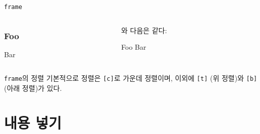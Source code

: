 \documentclass[compress]{beamer}
\begin{document}
\begin{frame}[fragile=singleslide]{\texttt{frame}}
  \begin{columns}
    \begin{column}{0.5\textwidth}
      \begin{latexcode}
        \begin{frame}[c]
          \frametitle{Foo}
          Bar
        \end{frame}
      \end{latexcode}
    \end{column}
    \begin{column}{0.5\textwidth}
      와 다음은 같다:
      \begin{latexcode}
        \begin{frame}[c]{Foo}
          Bar
        \end{frame}
      \end{latexcode}
    \end{column}
  \end{columns}
  \vpad
  \begin{alertblock}{\texttt{frame}의 정렬}
    기본적으로 정렬은 \verb/[c]/로 가운데 정렬이며, 이외에 \verb/[t]/
    (위 정렬)와 \verb/[b]/ (아래 정렬)가 있다.
  \end{alertblock}
\end{frame}

\section{내용 넣기}
\end{document}
